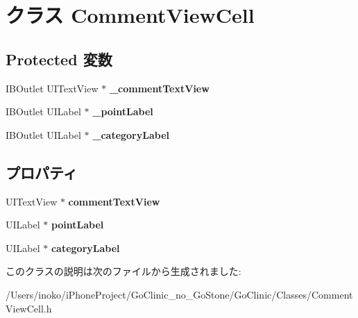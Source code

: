 \hypertarget{interface_comment_view_cell}{
\section{クラス CommentViewCell}
\label{interface_comment_view_cell}
}
\subsection*{Protected 変数}
\begin{DoxyCompactItemize}
\item 
\hypertarget{interface_comment_view_cell_ac15e3cdcaace3833b5db0d2676876ed8}{
IBOutlet UITextView $\ast$ {\bfseries \_\-commentTextView}}
\label{interface_comment_view_cell_ac15e3cdcaace3833b5db0d2676876ed8}

\item 
\hypertarget{interface_comment_view_cell_a94ea33992b8ab292c5692635c0247048}{
IBOutlet UILabel $\ast$ {\bfseries \_\-pointLabel}}
\label{interface_comment_view_cell_a94ea33992b8ab292c5692635c0247048}

\item 
\hypertarget{interface_comment_view_cell_a1bd1f6ac5b060cfc8be5c5907bfb79ac}{
IBOutlet UILabel $\ast$ {\bfseries \_\-categoryLabel}}
\label{interface_comment_view_cell_a1bd1f6ac5b060cfc8be5c5907bfb79ac}

\end{DoxyCompactItemize}
\subsection*{プロパティ}
\begin{DoxyCompactItemize}
\item 
\hypertarget{interface_comment_view_cell_af57f6a409c565d37717bd11bd29711aa}{
UITextView $\ast$ {\bfseries commentTextView}}
\label{interface_comment_view_cell_af57f6a409c565d37717bd11bd29711aa}

\item 
\hypertarget{interface_comment_view_cell_a2cd31e157cc9e6139da1343fe5c48feb}{
UILabel $\ast$ {\bfseries pointLabel}}
\label{interface_comment_view_cell_a2cd31e157cc9e6139da1343fe5c48feb}

\item 
\hypertarget{interface_comment_view_cell_a4ed6a62da88abead5dfb3cdf260205af}{
UILabel $\ast$ {\bfseries categoryLabel}}
\label{interface_comment_view_cell_a4ed6a62da88abead5dfb3cdf260205af}

\end{DoxyCompactItemize}


このクラスの説明は次のファイルから生成されました:\begin{DoxyCompactItemize}
\item 
/Users/inoko/iPhoneProject/GoClinic\_\-no\_\-GoStone/GoClinic/Classes/CommentViewCell.h\end{DoxyCompactItemize}
